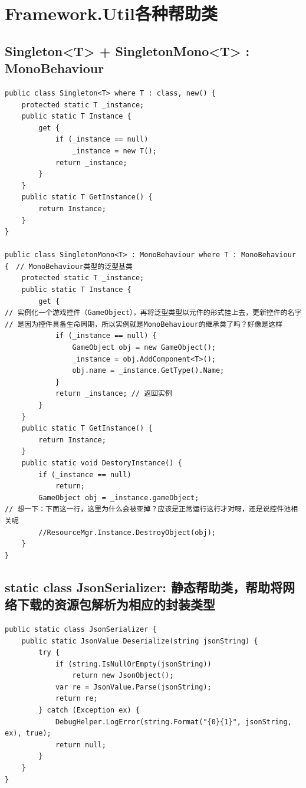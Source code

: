 \documentclass[9pt, b5paper]{article}
\begin{document}
\section{Framework.Util各种帮助类}
\label{sec-9}
\subsection{Singleton<T> + SingletonMono<T> : MonoBehaviour}
\label{sec-9-1}
\begin{verbatim}
public class Singleton<T> where T : class, new() {
    protected static T _instance;
    public static T Instance {
        get {
            if (_instance == null) 
                _instance = new T();
            return _instance;
        }
    }
    public static T GetInstance() {
        return Instance;
    }
}

public class SingletonMono<T> : MonoBehaviour where T : MonoBehaviour {　// MonoBehaviour类型的泛型基类
    protected static T _instance;
    public static T Instance {
        get {
// 实例化一个游戏控件（GameObject），再将泛型类型以元件的形式挂上去，更新控件的名字
// 是因为控件具备生命周期，所以实例就是MonoBehaviour的继承类了吗？好像是这样
            if (_instance == null) {　
                GameObject obj = new GameObject();
                _instance = obj.AddComponent<T>();
                obj.name = _instance.GetType().Name;
            }
            return _instance; // 返回实例
        }
    }
    public static T GetInstance() {
        return Instance;
    }
    public static void DestoryInstance() {
        if (_instance == null)
            return;
        GameObject obj = _instance.gameObject;
// 想一下：下面这一行，这里为什么会被亚掉？应该是正常运行这行才对呀，还是说控件池相关呢
        //ResourceMgr.Instance.DestroyObject(obj);　
    }
}
\end{verbatim}
\subsection{static class JsonSerializer: 静态帮助类，帮助将网络下载的资源包解析为相应的封装类型}
\label{sec-9-2}
\begin{verbatim}
public static class JsonSerializer {
    public static JsonValue Deserialize(string jsonString) {
        try {
            if (string.IsNullOrEmpty(jsonString)) 
                return new JsonObject();
            var re = JsonValue.Parse(jsonString);
            return re;
        } catch (Exception ex) {
            DebugHelper.LogError(string.Format("{0}{1}", jsonString, ex), true);
            return null;
        }
    }
}
\end{verbatim}
\end{document}
